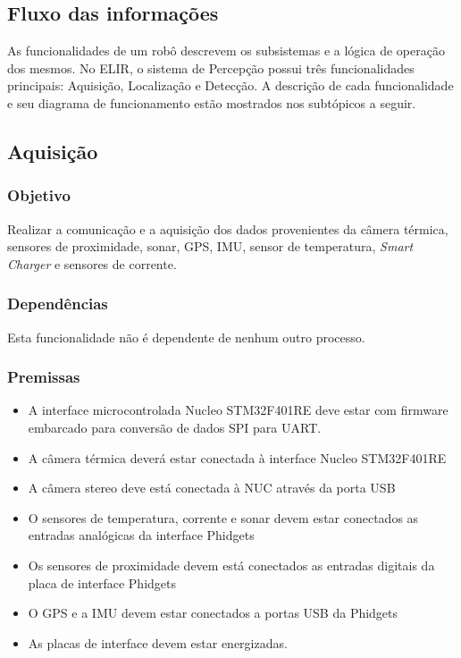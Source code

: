 \subsection{Fluxo das informações}
\label{ssec:fluxo}


As funcionalidades de um robô descrevem os subsistemas e a lógica de operação dos mesmos. No ELIR, o sistema de Percepção possui três funcionalidades principais: Aquisição, Localização e Detecção. A descrição de cada funcionalidade e seu diagrama de funcionamento estão mostrados nos subtópicos a seguir. 

\subsection{Aquisição}
\label{ssec:func1}
\subsubsection{Objetivo}
Realizar a comunicação e a aquisição dos dados provenientes da câmera térmica, sensores de proximidade, sonar, GPS, IMU, sensor de temperatura, \textit{Smart Charger} e sensores de corrente.

\subsubsection{Dependências}
Esta funcionalidade não é dependente de nenhum outro processo.

\subsubsection{Premissas}
\begin{itemize}
	\item A interface microcontrolada Nucleo STM32F401RE deve estar com firmware embarcado para conversão de dados SPI para UART.
	\item A câmera térmica deverá estar conectada à interface Nucleo STM32F401RE
	\item A câmera stereo deve está conectada à NUC através da porta USB
	\item O sensores de temperatura, corrente e sonar devem estar conectados as entradas analógicas da interface Phidgets
	\item Os sensores de proximidade devem está conectados as entradas digitais da placa de interface Phidgets
	\item O GPS e a IMU devem estar conectados a portas USB da Phidgets
	\item As placas de interface devem estar energizadas.
\end{itemize}

